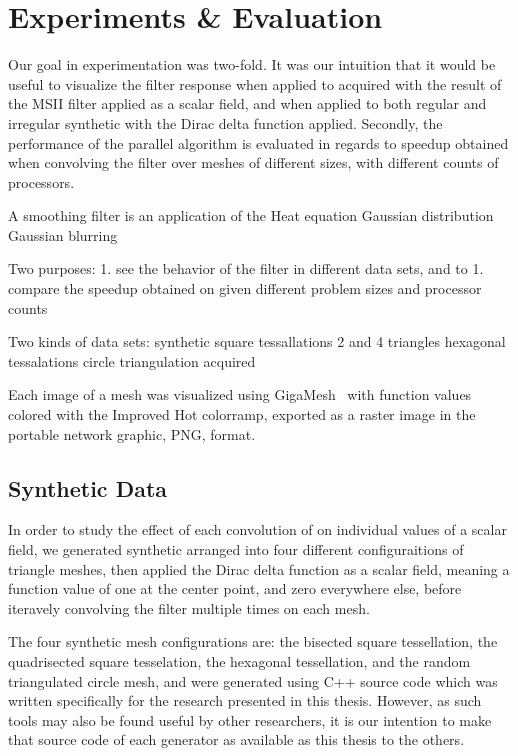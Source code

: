 \chapter{Experiments \& Evaluation}
Our goal in experimentation was two-fold. It was our intuition that it would be useful to visualize the filter response when applied to acquired \tdd{} with the result of the MSII filter applied as a scalar field, and when applied to both regular and irregular synthetic \tdd{} with the Dirac delta function applied. Secondly, the performance of the parallel algorithm is evaluated in regards to speedup obtained when convolving the filter over meshes of different sizes, with different counts of processors.

A smoothing filter is an application of the Heat equation 
Gaussian distribution
Gaussian blurring

Two purposes:
	1. see the behavior of the filter in different data sets, and to
	1. compare the speedup obtained on given different problem sizes and processor counts

Two kinds of data sets:
	synthetic
		square tessallations 2 and 4 triangles
		hexagonal tessalations
		circle triangulation
	acquired

Each image of a mesh was visualized using GigaMesh~\cite{Mara10} with function values colored with the Improved Hot colorramp, exported as a raster image in the portable network graphic, PNG, format.%


%
%
%
%
%
%
\section{Synthetic Data}
In order to study the effect of each convolution of  on individual values of a scalar field, we generated synthetic \tdd{} arranged into four different configuraitions of triangle meshes, then applied the Dirac delta function as a scalar field, meaning a function value of one at the center point, and zero everywhere else, before iteravely convolving the filter multiple times on each mesh.

The four synthetic mesh configurations are: the bisected square tessellation, the quadrisected square tesselation, the hexagonal tessellation, and the random triangulated circle mesh, and were generated using C++ source code which was written specifically for the research presented in this thesis. However, as such tools may also be found useful by other researchers, it is our intention to make that source code of each generator as available as this thesis to the others.



